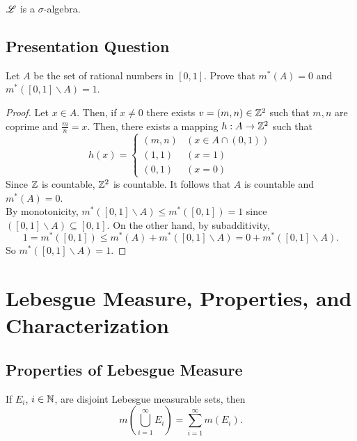 \documentclass[class=book, crop=false]{standalone}
\begin{document}
        \begin{theorem}
            $\mathscr{L}$ is a $\sigma$-algebra.
        \end{theorem}


        \subsection{Presentation Question}
        \begin{question}
            Let $A$ be the set of rational numbers in $[0, 1]$. Prove that $m^*(A) = 0$ and $m^*([0, 1] \backslash A) = 1$.
        \end{question}
        \begin{proof}
            Let $x \in A$. Then, if $x \neq 0$ there exists $v = (m, n) \in \mathbb{Z}^2$ such that $m, n$ are coprime and $\frac{m}{n} = x$. Then, there exists a mapping $h: A \rightarrow \mathbb{Z}^2$ such that
            \begin{equation*}
                h(x) = \begin{cases}
                    (m, n) & (x \in A \cap (0, 1)) \\
                    (1, 1) & (x = 1) \\
                    (0, 1) & (x = 0)
                \end{cases}
            \end{equation*}
            Since $\mathbb{Z}$ is countable, $\mathbb{Z}^{2}$ is countable. It follows that $A$ is countable and $m^*(A) = 0$. \\
            By monotonicity, $m^*([0, 1] \backslash A) \leq m^*([0, 1]) = 1$ since $([0, 1] \backslash A) \subseteq [0, 1]$. On the other hand, by subadditivity,
            \begin{equation*}
                1 = m^*([0, 1]) \leq m^*(A) + m^*([0, 1] \backslash A) = 0 + m^*([0, 1] \backslash A).
            \end{equation*}
            So $m^*([0, 1] \backslash A) = 1$.
        \end{proof}


    \section{Lebesgue Measure, Properties, and Characterization}
    \subsection{Properties of Lebesgue Measure}
    \begin{theorem}
        If $E_i$, $i \in \mathbb{N}$, are disjoint Lebesgue measurable sets, then
        \begin{equation*}
            m\left(\bigcup^{\infty}_{i = 1} E_i\right) = \sum^{\infty}_{i = 1} m(E_i).
        \end{equation*}
    \end{theorem}
    
\end{document}

